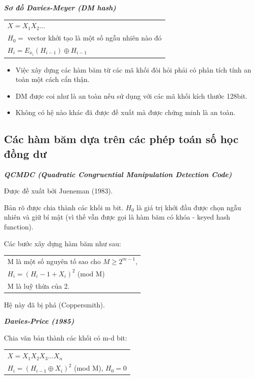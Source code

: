 \documentclass[a4paper,12pt]{report}
\begin{document}
\textbf{\textit{Sơ đồ Davies-Meyer (DM hash)}}
\begin{center}
\begin{tabular}{l}
$X = X_1 X_2 \ldots$ \\
$H_0 = $ vector khởi tạo là một số ngẫu nhiên nào đó \\
$H_i = E_{x_i}(H_{i-1}) \oplus H_{i-1}$	 \\
\end{tabular}
\end{center}
\begin{itemize}
\item Việc xây dựng các hàm băm từ các mã khối đòi hỏi phải có phân tích tính an toàn một cách cẩn thận.
\item DM được coi như là an toàn nếu sử dụng với các mã khối kích thước 128bit.
\item Không có hệ nào khác đã được đề xuất mà được chứng minh là an toàn.
\end{itemize}
\subsection*{Các hàm băm dựa trên các phép toán số học đồng dư}
\textbf{\textit{QCMDC (Quadratic Congruential Manipulation Detection Code)}}

Được đề xuất bởi Jueneman (1983).

Bản rõ được chia thành các khối m bit. $H_0$ là giá trị khởi đầu được chọn ngẫu nhiên và giữ bí mật (vì thế vẫn được gọi là hàm băm có khóa - keyed hash function).

Các bước xây dựng hàm băm như sau:
\begin{center}
\begin{tabular}{l}
M là một số nguyên tố sao cho $M \geq 2^{m-1}$, \\ 
$H_i = (H_i - 1 + X_i)^2$ (mod M) \\
M là luỹ thừa của 2.
\end{tabular}
\end{center}

Hệ này đã bị phá (Coppersmith).

\textbf{\textit{Davies-Price (1985)}}

Chia văn bản thành các khối có m-d bit:
\begin{center}
\begin{tabular}{l}
$X = X_1 X_2 X_3 \ldots X_n$ \\
$H_i = (H_{i-1} \oplus X_i)^2$ (mod M), $H_0 = 0$
\end{tabular}
\end{center}
\end{document}
